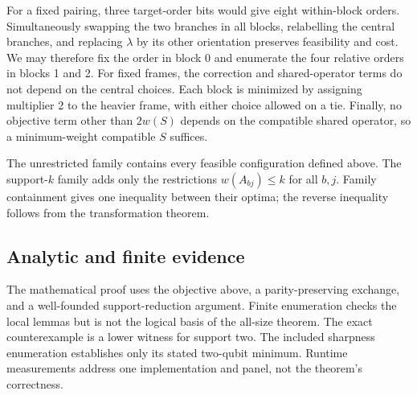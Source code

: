 For a fixed pairing, three target-order bits would give eight within-block orders. Simultaneously swapping the two branches in all blocks, relabelling the central branches, and replacing $\lambda$ by its other orientation preserves feasibility and cost. We may therefore fix the order in block 0 and enumerate the four relative orders in blocks 1 and 2. For fixed frames, the correction and shared-operator terms do not depend on the central choices. Each block is minimized by assigning multiplier 2 to the heavier frame, with either choice allowed on a tie. Finally, no objective term other than $2w(S)$ depends on the compatible shared operator, so a minimum-weight compatible $S$ suffices.

The unrestricted family contains every feasible configuration defined above. The support-$k$ family adds only the restrictions $w(A_{bj})\le k$ for all $b,j$. Family containment gives one inequality between their optima; the reverse inequality follows from the transformation theorem.

\subsection{Analytic and finite evidence}
The mathematical proof uses the objective above, a parity-preserving exchange, and a well-founded support-reduction argument. Finite enumeration checks the local lemmas but is not the logical basis of the all-size theorem. The exact counterexample is a lower witness for support two. The included sharpness enumeration establishes only its stated two-qubit minimum. Runtime measurements address one implementation and panel, not the theorem's correctness.
